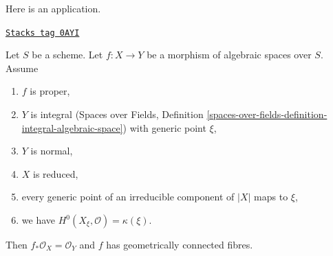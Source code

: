 Here is an application.

\begin{lemma}
\label{spaces-more-morphisms-lemma-geometrically-connected-fibres-towards-normal}
\href{https://stacks.math.columbia.edu/tag/0AYI}{\texttt{Stacks tag 0AYI}}

Let $S$ be a scheme. Let $f : X \to Y$ be a morphism of algebraic
spaces over $S$. Assume
\begin{enumerate}
\item $f$ is proper,
\item $Y$ is integral (Spaces over Fields, Definition
\ref{spaces-over-fields-definition-integral-algebraic-space})
with generic point $\xi$,
\item $Y$ is normal,
\item $X$ is reduced,
\item every generic point of an irreducible component of $|X|$ maps to $\xi$,
\item we have $H^0(X_\xi, \mathcal{O}) = \kappa(\xi)$.
\end{enumerate}
Then $f_*\mathcal{O}_X = \mathcal{O}_Y$ and $f$
has geometrically connected fibres.
\end{lemma}

